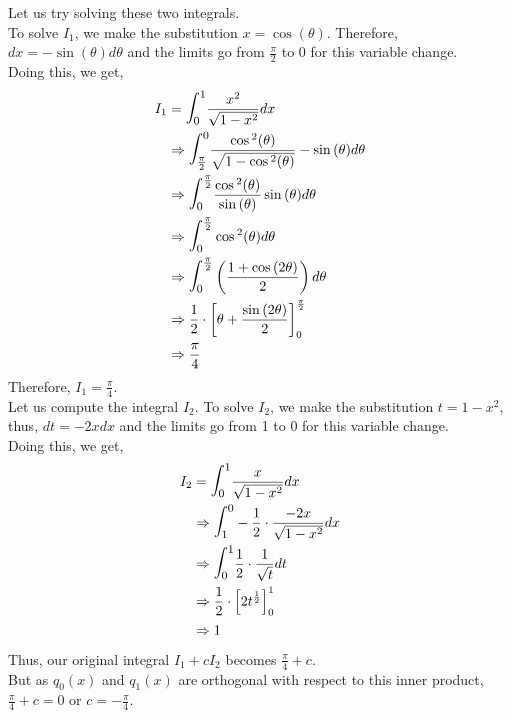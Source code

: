 \documentclass[letterpaper]{exam}
\begin{document}
\begin{questions}
\begin{parts}
\begin{solution}
Let us try solving these two integrals.\\
To solve $I_1$, we make the substitution $x = \cos{(\theta)}$. Therefore, $dx = -\sin{(\theta)} d\theta$ and the limits go from $\frac{\pi}{2}$ to 0 for this variable change.\\
Doing this, we get,
\begin{align*}
    I_1 &= \mathlarger{\mathlarger{\int}}_0^1 \frac{x^2}{\sqrt{1-x^2}} dx\\
    &\Rightarrow
    \mathlarger{\mathlarger{\int}}_{\frac{\pi}{2}}^0 \frac{\cos{ ^2(\theta)}}{\sqrt{1-\cos{ ^2(\theta)}}} -\sin{(\theta)} d\theta \\
    &\Rightarrow
    \mathlarger{\mathlarger{\int}}_0^{\frac{\pi}{2}} \frac{\cos{ ^2(\theta)}}{\sin{(\theta)}} \sin{(\theta)} d\theta\\
    &\Rightarrow
    \mathlarger{\mathlarger{\int}}_0^{\frac{\pi}{2}} \cos{ ^2(\theta)} d\theta\\
    &\Rightarrow
    \mathlarger{\mathlarger{\int}}_0^{\frac{\pi}{2}} \left(\frac{1 + \cos{(2\theta)}}{2}\right) d\theta\\
    &\Rightarrow
    \frac{1}{2}\cdot \left[\theta + \frac{\sin{(2\theta)}}{2}\right]_{0}^{\frac{\pi}{2}}\\
    &\Rightarrow
    \frac{\pi}{4}
\end{align*}
Therefore, $I_1 = \frac{\pi}{4}$.\\
Let us compute the integral $I_2$. To solve $I_2$, we make the substitution $t = 1-x^2$, thus, $dt = -2x dx$ and the limits go from 1 to 0 for this variable change.\\
Doing this, we get,
\begin{align*}
    I_2 &= \mathlarger{\mathlarger{\int}}_0^1 \frac{x}{\sqrt{1-x^2}} dx\\
    &\Rightarrow
    \mathlarger{\mathlarger{\int}}_1^0 -\frac{1}{2}\cdot\frac{-2x}{\sqrt{1-x^2}} dx\\
    &\Rightarrow
    \mathlarger{\mathlarger{\int}}_0^1 \frac{1}{2}\cdot\frac{1}{\sqrt{t}} dt\\
    &\Rightarrow
    \frac{1}{2}\cdot \left[2t^{\frac{1}{2}}\right]_{0}^1\\
    &\Rightarrow
    1
\end{align*}
Thus, our original integral $I_1 + cI_2$ becomes $\frac{\pi}{4} + c$.\\
But as $q_0(x)$ and $q_1(x)$ are orthogonal with respect to this inner product, $\frac{\pi}{4} + c = 0$ or $c = -\frac{\pi}{4}$.\\

\end{solution}
\end{parts}
\end{questions}
\end{document}
